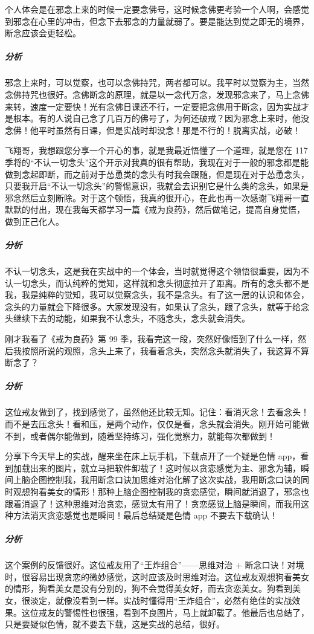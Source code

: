 \begin{case}
    个人体会是在邪念上来的时候一定要念佛号，这时候念佛更考验一个人啊，会感觉到邪念在心里的冲击，但念下去邪念的力量就弱了。要是能达到觉之即无的境界，断念应该会更轻松。
    \subparagraph{分析} 邪念上来时，可以觉察，也可以念佛持咒，两者都可以。我平时以觉察为主，当然念佛持咒也很好。念佛断念的原理，就是以一念代万念，发现邪念来了，马上念佛来转，速度一定要快！光有念佛日课还不行，一定要把念佛用于断念，因为实战才是根本。有的人说自己念了几百万的佛号了，为何还破戒？因为邪念上来时，他没念佛！他平时虽然有日课，但是实战时却没念！那是不行的！脱离实战，必破！
\end{case}

\begin{case}
    飞翔哥，我想跟您分享一个开心的事，就是我最近悟懂了一个道理，就是您在 117 季将的“不认一切念头”这个开示对我真的很有帮助，我现在对于一般的邪念都是能做到念起即断，而之前对于怂恿类的念头有时我会跟随，但是现在对于怂恿念头，只要我开启“不认一切念头”的警惕意识，我就会去识别它是什么类的念头，如果是邪念然后立刻断除。对于这个顿悟，我真的很开心，在此也再一次感谢飞翔哥一直默默的付出，现在我每天都学习一篇《戒为良药》，然后做笔记，提高自身觉悟，做到正己化人。
    \subparagraph{分析} 不认一切念头，这是我在实战中的一个体会，当时就觉得这个领悟很重要，因为不认一切念头，而认纯粹的觉知，这样就和念头彻底拉开了距离。所有的念头都不是我，我是纯粹的觉知，我可以觉察念头，我不是念头。有了这一层的认识和体会，念头的力量就会下降很多。大家发现没有，如果认了念头，跟了念头，就等于给念头继续下去的动能，如果我不认念头，不随念头，念头就会消失。
\end{case}

\begin{case}
    刚才我看了《戒为良药》第 99 季，我看完这一段，突然好像悟到了什么一样，然后我按照所说的观照，念头上来了，我看着念头，突然念头就消失了，我这算不算断念了？
    \subparagraph{分析} 这位戒友做到了，找到感觉了，虽然他还比较无知。记住：看消灭念！去看念头！而不是去压念头！看和压，是两个动作，仅仅是看，念头就会消失。刚开始可能做不到，或者偶尔能做到，随着坚持练习，强化觉察力，就能每次都做到！
\end{case}

\begin{case}
    分享下今天早上的实战，醒来坐在床上玩手机，下载点开了一个疑是色情 app，看到加载出来的图片，就立马把软件卸载了！这时候以贪恋感觉为主、邪念为辅，瞬间上脑企图控制我，我用断念口诀加思维对治化解了这次实战，我用断念口诀的同时观想狗看美女的情形！那种上脑企图控制我的贪恋感觉，瞬间就消退了，邪念也跟着消退了！这种思维对治贪恋，感觉太有用了！贪恋感觉上脑是瞬间，而我用这种方法消灭贪恋感觉也是瞬间！最后总结疑是色情 app 不要去下载确认！
    \subparagraph{分析} 这个案例的反馈很好。这位戒友用了“王炸组合”——思维对治 + 断念口诀！对境时，很容易出现贪恋的微妙感觉，这时应该及时思维对治。这位戒友观想狗看美女的情形，狗看美女是没有分别的，狗不会觉得美女好，而去贪恋美女。狗看到美女，很淡定，就像没看到一样。实战时懂得用“王炸组合”，必然有绝佳的实战效果。这位戒友的警惕性也很强，看到不良图片，马上就卸载了。他最后也总结了，只是要疑似色情，就不要去下载，这是实战的总结，很好。
\end{case}

